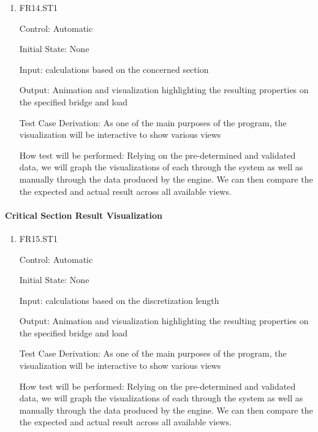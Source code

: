 \documentclass[12pt, titlepage]{article}
\begin{document}
\begin{enumerate}

\item{FR14.ST1\\}

Control: Automatic
				
Initial State: None
					
Input: calculations based on the concerned section 
					
Output: Animation and visualization highlighting the resulting properties on the specified bridge and load 

Test Case Derivation: As one of the main purposes of the program, the visualization will be interactive to show various views

How test will be performed: Relying on the pre-determined and validated data, we will graph the visualizations of each through the system as well as manually through the data produced by the engine. We can then compare the the expected and actual result across all available views. 
			
\end{enumerate}

\paragraph{Critical Section Result Visualization}

\begin{enumerate}

\item{FR15.ST1\\}

Control: Automatic
					
Initial State: None
					
Input: calculations based on the discretization length 
					
Output:  Animation and visualization highlighting the resulting properties on the specified bridge and load 

Test Case Derivation: As one of the main purposes of the program, the visualization will be interactive to show various views

How test will be performed: Relying on the pre-determined and validated data, we will graph the visualizations of each through the system as well as manually through the data produced by the engine. We can then compare the the expected and actual result across all available views. 

\end{enumerate}
\end{document}
